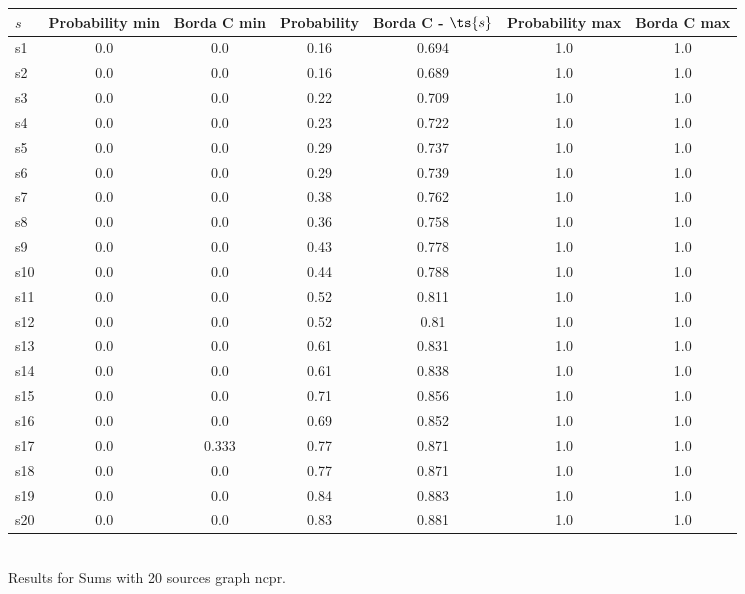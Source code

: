 \documentclass{article}
\begin{document}
\noindent\begin{tabular}{|l|c|c|c|c|c|c|}
\hline
$s$& Probability min & Borda C min & Probability & Borda C - $\ts{s}$ & Probability max & Borda C max\\
\hline
s1 &0.0 & 0.0 & 0.16 & 0.694 & 1.0 & 1.0\\
\hline
s2 &0.0 & 0.0 & 0.16 & 0.689 & 1.0 & 1.0\\
\hline
s3 &0.0 & 0.0 & 0.22 & 0.709 & 1.0 & 1.0\\
\hline
s4 &0.0 & 0.0 & 0.23 & 0.722 & 1.0 & 1.0\\
\hline
s5 &0.0 & 0.0 & 0.29 & 0.737 & 1.0 & 1.0\\
\hline
s6 &0.0 & 0.0 & 0.29 & 0.739 & 1.0 & 1.0\\
\hline
s7 &0.0 & 0.0 & 0.38 & 0.762 & 1.0 & 1.0\\
\hline
s8 &0.0 & 0.0 & 0.36 & 0.758 & 1.0 & 1.0\\
\hline
s9 &0.0 & 0.0 & 0.43 & 0.778 & 1.0 & 1.0\\
\hline
s10 &0.0 & 0.0 & 0.44 & 0.788 & 1.0 & 1.0\\
\hline
s11 &0.0 & 0.0 & 0.52 & 0.811 & 1.0 & 1.0\\
\hline
s12 &0.0 & 0.0 & 0.52 & 0.81 & 1.0 & 1.0\\
\hline
s13 &0.0 & 0.0 & 0.61 & 0.831 & 1.0 & 1.0\\
\hline
s14 &0.0 & 0.0 & 0.61 & 0.838 & 1.0 & 1.0\\
\hline
s15 &0.0 & 0.0 & 0.71 & 0.856 & 1.0 & 1.0\\
\hline
s16 &0.0 & 0.0 & 0.69 & 0.852 & 1.0 & 1.0\\
\hline
s17 &0.0 & 0.333 & 0.77 & 0.871 & 1.0 & 1.0\\
\hline
s18 &0.0 & 0.0 & 0.77 & 0.871 & 1.0 & 1.0\\
\hline
s19 &0.0 & 0.0 & 0.84 & 0.883 & 1.0 & 1.0\\
\hline
s20 &0.0 & 0.0 & 0.83 & 0.881 & 1.0 & 1.0\\
\hline
\end{tabular}\\

\noindent Results for Sums with 20 sources graph ncpr.
\end{document}
